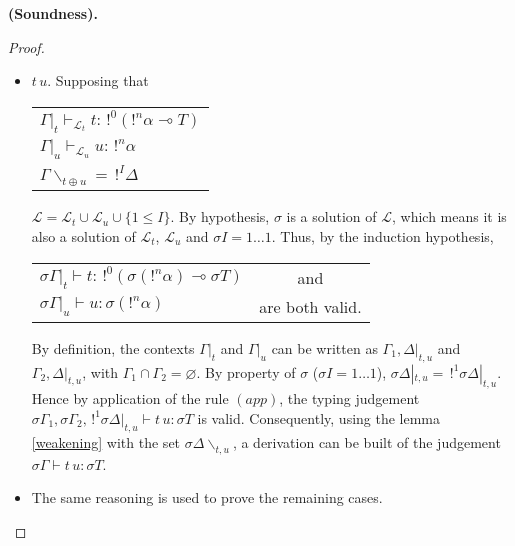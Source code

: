 \begin{prop}{\bf (Soundness).}
\begin{proof}
\begin{itemize}
		\item $t \, u$. Supposing that
			\begin{center}
			\begin{tabular}{l}
				$\Gamma |_t \vdash_{\mathcal{L}_t} t : \,!^0(!^n\alpha \multimap T)$ \\
				$\Gamma |_u \vdash_{\mathcal{L}_u} u : \,!^n\alpha$ \\
				$\Gamma \backslash_{t \oplus u} = \,!^I \Delta$
			\end{tabular}
			\end{center}
			$\mathcal{L} = \mathcal{L}_t \cup \mathcal{L}_u \cup \{ 1 \le I \}$. By hypothesis, $\sigma$ is a solution of $\mathcal{L}$,
			which means it is also a solution of $\mathcal{L}_t$, $\mathcal{L}_u$ and $\sigma I = 1 \dots 1$.
			Thus, by the induction hypothesis,
				\begin{center}
				\begin{tabular}{lc}
					$\sigma \Gamma|_t \vdash t : \,!^0(\sigma (!^n\alpha) \multimap \sigma T)$ & and \\
			  	$\sigma \Gamma|_u \vdash u : \sigma (!^n\alpha)$ & are both valid.
			  \end{tabular}
			  \end{center}
			By definition, the contexts $\Gamma|_t$ and $\Gamma|_u$ can be written as $\Gamma_1, \Delta|_{t, u}$ and $\Gamma_2, \Delta |_{t, u}$,
			with $\Gamma_1 \cap \Gamma_2 = \varnothing$. By property of $\sigma$ ($\sigma I = 1 \dots 1$),
			$\sigma \Delta|_{t, u} = \,!^1 \sigma \Delta|_{t, u}$. Hence by application of the rule $(app)$,
			the typing judgement $\sigma\Gamma_1, \sigma\Gamma_2, \,!^1\sigma\Delta|_{t, u} \vdash t \, u : \sigma T$ is valid.
			Consequently, using the lemma \ref{weakening} with the set $\sigma\Delta \backslash_{t, u}$, a derivation can be built of the judgement
			$\sigma\Gamma \vdash t \, u : \sigma T$.
			
		\item The same reasoning is used to prove the remaining cases.
		
 		\end{itemize}
	\end{proof}
\end{prop}

